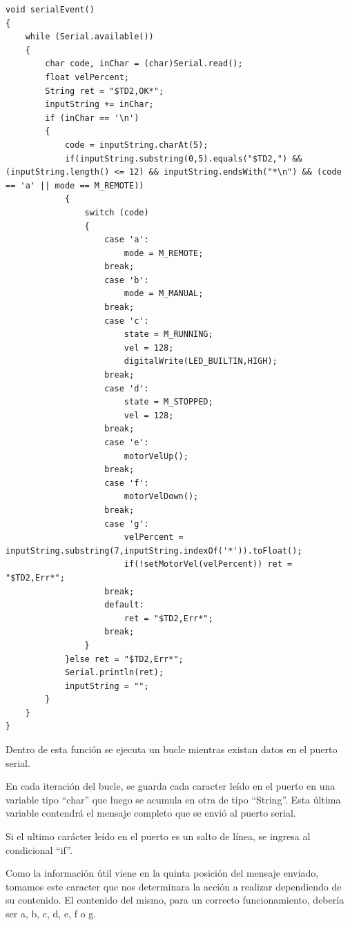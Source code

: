 \documentclass[a4paper, 12pt]{article}
\begin{document}
\begin{lstlisting}
void serialEvent()
{
    while (Serial.available())
    {
        char code, inChar = (char)Serial.read();
        float velPercent;
        String ret = "$TD2,OK*";
        inputString += inChar;
        if (inChar == '\n')
        {
            code = inputString.charAt(5);
            if(inputString.substring(0,5).equals("$TD2,") && (inputString.length() <= 12) && inputString.endsWith("*\n") && (code == 'a' || mode == M_REMOTE))
            {
                switch (code)
                {
                    case 'a':
                        mode = M_REMOTE;
                    break;
                    case 'b':
                        mode = M_MANUAL;
                    break;
                    case 'c':
                        state = M_RUNNING;
                        vel = 128;
                        digitalWrite(LED_BUILTIN,HIGH);
                    break;
                    case 'd':
                        state = M_STOPPED;
                        vel = 128;
                    break;
                    case 'e':
                        motorVelUp();
                    break;
                    case 'f':
                        motorVelDown();
                    break;
                    case 'g':
                        velPercent = inputString.substring(7,inputString.indexOf('*')).toFloat();
                        if(!setMotorVel(velPercent)) ret = "$TD2,Err*";
                    break;
                    default:
                        ret = "$TD2,Err*";
                    break;
                }
            }else ret = "$TD2,Err*";
            Serial.println(ret);
            inputString = "";
        }
    }
}
\end{lstlisting}

Dentro de esta función se ejecuta un bucle mientras existan datos en el puerto serial.

En cada iteración del bucle, se guarda cada caracter leído en el puerto en una variable tipo ``char'' que luego se acumula en otra de tipo ``String''. Esta última variable contendrá el mensaje completo que se envió al puerto serial.

Si el ultimo carácter leído en el puerto es un salto de línea, se ingresa al condicional ``if''.

Como la información útil viene en la quinta posición del mensaje enviado, tomamos este caracter que nos determinara la acción a realizar dependiendo de su contenido. El contenido del mismo, para un correcto funcionamiento, debería ser a, b, c, d, e, f o g.
\end{document}
